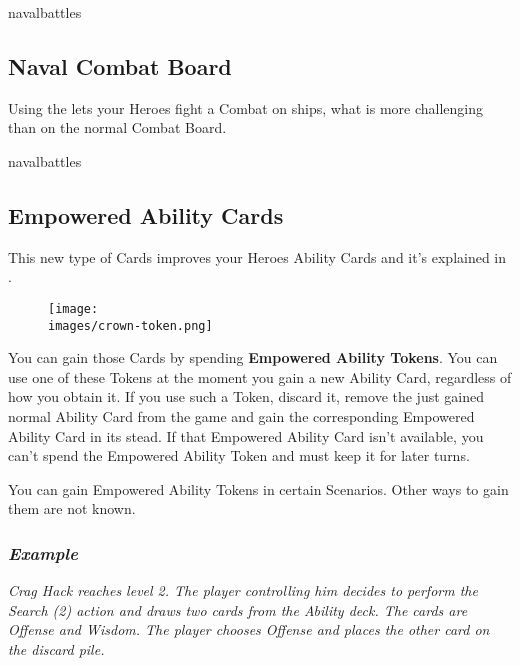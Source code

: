 \begin{multicols*}{2}
\vspace*{1em}
\begin{expansion}{navalbattles}
    \subsection*{Naval Combat Board}
    Using the  lets your Heroes fight a Combat on ships, what is more challenging than on the normal Combat Board.
\end{expansion}

\begin{expansion}[before=\vspace*{-11mm}]{navalbattles}
  \subsection*{Empowered Ability Cards}
  This new type of Cards improves your Heroes Ability Cards and it's explained in .

  \setlength\intextsep{0pt}
  \setlength\columnsep{1em}
  \begin{wrapfigure}{r}{0.2\linewidth}
    \texttt{[image: \\images/crown-token.png]}
  \end{wrapfigure}
  You can gain those Cards by spending \textbf{Empowered Ability Tokens}.
  You can use one of these Tokens at the moment you gain a new Ability Card, regardless of how you obtain it.
  If you use such a Token, discard it, remove the just gained normal Ability Card from the game and gain the corresponding Empowered Ability Card in its stead.
  If that Empowered Ability Card isn't available, you can't spend the Empowered Ability Token and must keep it for later turns.

  You can gain Empowered Ability Tokens in certain Scenarios.
  Other ways to gain them are not known.\\

  \subsubsection*{\textit{Example}}
  \textit{Crag Hack reaches level 2.
    The player controlling him decides to perform the Search (2) action and draws two cards from the Ability deck.
    The cards are Offense and Wisdom.
    The player chooses Offense and places the other card on the discard pile.}

  \begin{center}
  \end{center}


\end{expansion}
\end{multicols*}
